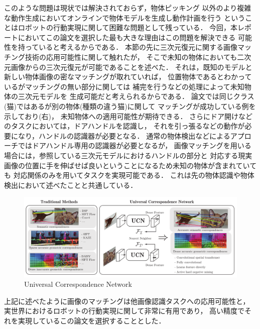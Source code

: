 このような問題は現状では解決されておらず，物体ピッキング\cite{Ian:DeepGrasp}
以外のより複雑な動作生成においてオンラインで物体モデルを生成し動作計画を行う
ということはロボットの行動実現に関して困難な問題として残っている．
今回，本レポートにおいてこの論文を選択した最も大きな理由はこの問題を解決できる
可能性を持っていると考えるからである．
本節の先に三次元復元に関する画像マッチング技術の応用可能性に関して触れたが，
そこで未知の物体においても二次元画像からの三次元復元が可能であることを述べた．
それは，既知のモデルと新しい物体画像の密なマッチングが取れていれば，
位置物体であるとわかっているがマッチングの無い部分に関しては
補完を行うなどの処理によって未知物体の三次元モデルを
生成可能だと考えられるからである．
論文では同じクラス(猫)ではあるが別の物体(種類の違う猫)に関して
マッチングが成功している例を示しており(右)，
未知物体への適用可能性が期待できる．
さらにドア開けなどのタスクにおいては，ドアハンドルを認識し，
それを引っ張るなどの動作が必要になり，ハンドルの認識器が必要となる．
通常の物体検出などによるアプローチではドアハンドル専用の認識器が必要となるが，
画像マッチングを用いる場合には，参照している三次元モデルにおけるハンドルの部分と
対応する現実画像の位置に手を伸ばせば良いということになるため未知の物体が含まれていても
対応関係のみを用いてタスクを実現可能である．
これは先の物体認識や物体検出において述べたことと共通している．

\begin{figure}[htbp]
  \centering
  \includegraphics[width=\columnwidth]{figs/ucn}
  \caption{Universal Correspondence Network \cite{choy_nips16}}
  \label{figure:ucn}
\end{figure}

上記に述べたように画像のマッチングは他画像認識タスクへの応用可能性と，
実世界におけるロボットの行動実現に関して非常に有用であり，
高い精度でそれを実現しているこの論文を選択することとした．
